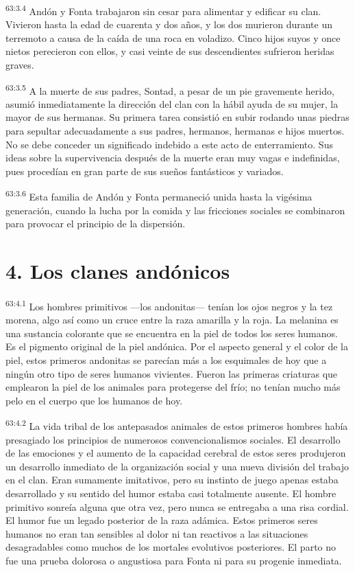 \par
\textsuperscript{63:3.4} Andón y Fonta trabajaron sin cesar para alimentar y edificar su clan. Vivieron hasta la edad de cuarenta y dos años, y los dos murieron durante un terremoto a causa de la caída de una roca en voladizo. Cinco hijos suyos y once nietos perecieron con ellos, y casi veinte de sus descendientes sufrieron heridas graves.

\par
\textsuperscript{63:3.5} A la muerte de sus padres, Sontad, a pesar de un pie gravemente herido, asumió inmediatamente la dirección del clan con la hábil ayuda de su mujer, la mayor de sus hermanas. Su primera tarea consistió en subir rodando unas piedras para sepultar adecuadamente a sus padres, hermanos, hermanas e hijos muertos. No se debe conceder un significado indebido a este acto de enterramiento. Sus ideas sobre la supervivencia después de la muerte eran muy vagas e indefinidas, pues procedían en gran parte de sus sueños fantásticos y variados.

\par
\textsuperscript{63:3.6} Esta familia de Andón y Fonta permaneció unida hasta la vigésima generación, cuando la lucha por la comida y las fricciones sociales se combinaron para provocar el principio de la dispersión.

\section*{4. Los clanes andónicos}
\par
\textsuperscript{63:4.1} Los hombres primitivos ---los andonitas--- tenían los ojos negros y la tez morena, algo así como un cruce entre la raza amarilla y la roja. La melanina es una sustancia colorante que se encuentra en la piel de todos los seres humanos. Es el pigmento original de la piel andónica. Por el aspecto general y el color de la piel, estos primeros andonitas se parecían más a los esquimales de hoy que a ningún otro tipo de seres humanos vivientes. Fueron las primeras criaturas que emplearon la piel de los animales para protegerse del frío; no tenían mucho más pelo en el cuerpo que los humanos de hoy.

\par
\textsuperscript{63:4.2} La vida tribal de los antepasados animales de estos primeros hombres había presagiado los principios de numerosos convencionalismos sociales. El desarrollo de las emociones y el aumento de la capacidad cerebral de estos seres produjeron un desarrollo inmediato de la organización social y una nueva división del trabajo en el clan. Eran sumamente imitativos, pero su instinto de juego apenas estaba desarrollado y su sentido del humor estaba casi totalmente ausente. El hombre primitivo sonreía alguna que otra vez, pero nunca se entregaba a una risa cordial. El humor fue un legado posterior de la raza adámica. Estos primeros seres humanos no eran tan sensibles al dolor ni tan reactivos a las situaciones desagradables como muchos de los mortales evolutivos posteriores. El parto no fue una prueba dolorosa o angustiosa para Fonta ni para su progenie inmediata.

